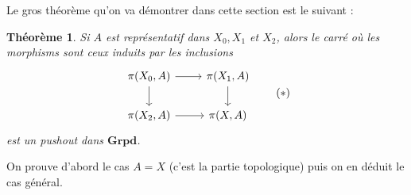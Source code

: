 \documentclass{article}
\newcommand{\Grpd}{\mathbf{Grpd}}
\newtheorem{theorem}{Théorème}[section]
\theoremstyle{definition}
\theoremstyle{remark}
\begin{document}
Le gros théorème qu'on va démontrer dans cette section est le suivant :

\begin{theorem} \label{vankampen}
    Si $A$ est représentatif dans $X_0,X_1$ et $X_2$, alors le carré où les morphisms sont ceux induits par les inclusions
    \begin{equation*} \label{vankampenpushout}
        \begin{tikzcd}
            \pi(X_0, A) \arrow[r] \arrow[d] & \pi(X_1, A) \arrow[d] \\
            \pi(X_2,A) \arrow[r] & \pi(X,A)
        \end{tikzcd}
        \tag{$*$}
    \end{equation*}
    est un pushout dans $\Grpd$.
\end{theorem}

On prouve d'abord le cas $A = X$ (c'est la partie topologique) puis on en déduit le cas général.
\end{document}
